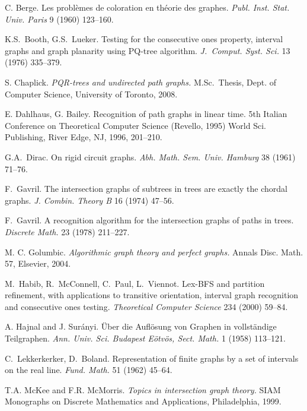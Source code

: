 \documentclass[11pt]{article}
\begin{document}
\begin{thebibliography}{99}

C. Berge.  Les probl\`emes de coloration en th\'eorie des graphes.
{\it Publ.  Inst.  Stat.  Univ.  Paris} 9 (1960) 123--160.

K.S.~Booth, G.S.~Lueker.  Testing for the consecutive ones property,
interval graphs and graph planarity using PQ-tree algorithm.
{\it J.~Comput.  Syst.  Sci.}  13 (1976) 335--379.

S. Chaplick.  {\it PQR-trees and undirected path graphs.}
M.Sc.~Thesis, Dept.  of Computer Science, University of Toronto, 2008.

E. Dahlhaus, G. Bailey.  Recognition of path graphs in linear time.
5th Italian Conference on Theoretical Computer Science (Revello, 1995)
World Sci.  Publishing, River Edge, NJ, 1996, 201--210.

G.A.~Dirac.  On rigid circuit graphs.  \emph{Abh.  Math.  Sem.  Univ.
Hamburg} 38 (1961) 71--76.

F.~Gavril.  The intersection graphs of subtrees in trees are exactly
the chordal graphs.  \emph{J. Combin.  Theory B} 16 (1974) 47--56.

F.~Gavril.  A recognition algorithm for the intersection graphs of
paths in trees.  \emph{Discrete Math.} 23 (1978) 211--227.

M. C. Golumbic.  {\it Algorithmic graph theory and perfect graphs.}
Annals Disc.  Math.  57, Elsevier, 2004.

M.~Habib, R.~McConnell, C.~Paul, L.~Viennot.  Lex-BFS and partition
refinement, with applications to transitive orientation, interval
graph recognition and consecutive ones testing.  \emph{Theoretical
Computer Science} 234 (2000) 59--84.

A. Hajnal and J. Sur\'anyi.  \"Uber die Aufl\"osung von Graphen in
vollst\"andige Teilgraphen.  {\it Ann.  Univ.  Sci.  Budapest
E\"otv\"os, Sect.  Math.} 1 (1958) 113--121.



C.~Lekkerkerker, D.~Boland.  Representation of finite graphs by a set
of intervals on the real line.  \emph{Fund.  Math.} 51 (1962) 45--64.

T.A. McKee and F.R. McMorris.  {\it Topics in intersection graph
theory.} SIAM Monographs on Discrete Mathematics and Applications,
Philadelphia, 1999.


\end{thebibliography}
\end{document}
